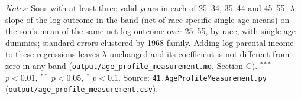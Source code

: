 \begin{table}[!htbp]
\begin{minipage}{\textwidth}\footnotesize \textit{Notes:} Sons with at least three valid years in each of 25--34, 35--44 and 45--55. $\lambda$: slope of the log outcome in the band (net of race-specific single-age means) on the son's mean of the same net log outcome over 25--55, by race, with single-age dummies; standard errors clustered by 1968 family. Adding log parental income to these regressions leaves $\lambda$ unchanged and its coefficient is not different from zero in any band (\texttt{output/age\_profile\_measurement.md}, Section C). $^{***}$ $p<0.01$, $^{**}$ $p<0.05$, $^{*}$ $p<0.1$. Source: \texttt{41.AgeProfileMeasurement.py} (\texttt{output/age\_profile\_measurement.csv}).\end{minipage}
\end{table}
